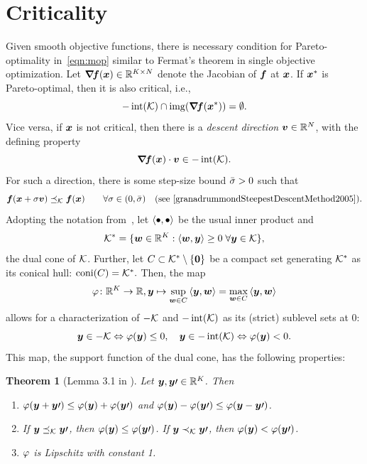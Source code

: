 \documentclass{article}
\theoremstyle{plain}
\newtheorem{theorem}{Theorem}
\theoremstyle{definition}
\begin{document}
\section{Criticality}
Given smooth objective functions, there is necessary condition for Pareto-optimality
in~\eqref{eqn:mop} similar to Fermat's theorem in single objective optimization.
Let $\bm{\nabla}\!\bm{f}(\bm{x}) \in \mathbb R^{K \times N}$ denote the Jacobian of $\bm{f}$
at $\bm{x}$. 
If $\bm{x}^*$ is Pareto-optimal, then it is also critical, i.e.,
\begin{equation*}
	-\operatorname{int}(\mathcal K) \cap \operatorname{img}(\bm{\nabla}\!\bm{f}(\bm{x}^*)) = \emptyset.
\end{equation*}
Vice versa, if $\bm{x}$ is not critical, then there is a \emph{descent direction}
$\bm{v} \in \mathbb R^N$, with the defining property 
$$\bm{\nabla}\!\bm{f}(\bm{x})\cdot \bm{v} \in -\operatorname{int}(\mathcal K).$$
For such a direction, there is some step-size bound $\bar{\sigma}>0$ such that
$$
\bm{f}(\bm{x} + \sigma \bm{v}) \preceq_\mathcal K \bm{f}(\bm{x}) \qquad \forall \sigma \in (0, \bar{\sigma})
\quad\text{(see \cite{granadrummondSteepestDescentMethod2005})}
.
$$
Adopting the notation from~\cite{%
granadrummondSteepestDescentMethod2005,%
lucambioperezNonlinearConjugateGradient2018%
},
let $\left\langle \bullet, \bullet \right\rangle$ be the usual inner product and 
$$\mathcal K^* = 
	\{
		\bm{w}\in \mathbb R^K: \left\langle \bm{w}, \bm{y} \right\rangle \ge 0 
		\; \forall \bm{y}\in \mathcal K
	\}
,$$
the dual cone of $\mathcal K$.
Further, let $C \subset \mathcal K^*\setminus \{\bm{0}\}$ be a compact set generating 
$\mathcal K^*$ as its conical hull: 
$\operatorname{coni}(C) = \mathcal K^*.$
Then, the map 
$$
\varphi \colon \mathbb R^K \to \mathbb R, 
\bm{y}\mapsto 
	\sup_{\bm{w} \in C}\left\langle \bm{y}, \bm{w} \right\rangle
	= \max_{\bm{w} \in C}\left\langle \bm{y}, \bm{w} \right\rangle
$$
allows for a characterization of $-\mathcal K$ and $-\operatorname{int}(\mathcal K)$ as its
(strict) sublevel sets at $0$:
$$
\bm{y} \in -\mathcal K \Leftrightarrow \varphi(\bm{y}) \leq 0,
\quad
\bm{y} \in -\operatorname{int}(\mathcal K) \Leftrightarrow \varphi(\bm{y}) < 0.
$$
This map, the support function of the dual cone, has the following properties:

\begin{theorem}[{Lemma 3.1 in \cite{granadrummondSteepestDescentMethod2005}}]%
	\label{thm:phiC_properties}
	Let $\bm{y}, \bm{y}\prime \in \mathbb R^K$.
	Then
	\begin{enumerate}
		\item $\varphi(\bm{y}+\bm{y}\prime) \le \varphi(\bm{y}) + \varphi(\bm{y}\prime)$
			and $\varphi(\bm{y})-\varphi(\bm{y}\prime) \le \varphi(\bm{y}-\bm{y}\prime)$.
		\item If $\bm{y} \preceq_\mathcal K \bm{y}\prime$, then $\varphi(\bm{y}) \leq \varphi(\bm{y}\prime)$.
			If $\bm{y} \prec_\mathcal K \bm{y}\prime$, then $\varphi(\bm{y}) < \varphi(\bm{y}\prime)$.
		\item $\varphi$ is Lipschitz with constant 1.
	\end{enumerate}
\end{theorem}
\end{document}
